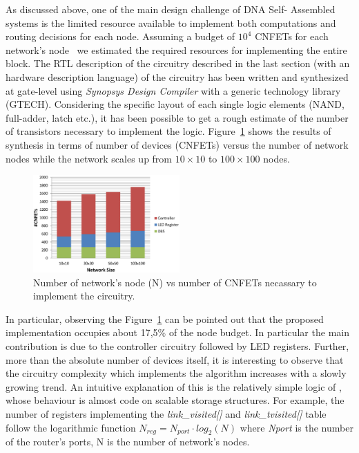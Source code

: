 As discussed above, one of the main design challenge of DNA Self-
Assembled systems is the limited resource available to implement both
computations and routing decisions for each node. Assuming a budget of
$10^4$ CNFETs for each network's node~\cite{liu_jetcs}  we estimated
the required resources for implementing the entire \disr{} block. The RTL
description of the circuitry described in the last section (with an
hardware description language)  of the \disr{} circuitry has been written
and synthesized at gate-level using \emph{Synopsys Design Compiler} with 
a generic technology library (GTECH).
Considering the specific layout of each single logic elements  (NAND,
full-adder, latch etc.), it has been possible to get a rough estimate
of the number of transistors necessary to implement the \disr{} logic.
Figure~\ref{fig:synthesys} shows the results of synthesis in terms of
number of devices (CNFETs) versus the number of network nodes while
the network scales up from $10\times10$ to $100\times100$ nodes.

\begin{figure}
  \centering
  \includegraphics[width=0.50\textwidth]{pictures/synthesis.eps}
  \caption{Number of network's node (N) vs number of CNFETs necassary to implement
  the \disr{} circuitry.}
 \label{fig:synthesys}
\end{figure}

In particular, observing the Figure~\ref{fig:synthesys} can  be
pointed out that the proposed implementation occupies about 17,5\% of
the node budget. In particular the main contribution is due to the
controller circuitry followed by LED registers. Further, more than the
absolute number of devices itself, it is interesting to observe that
the circuitry complexity which implements the \disr{} algorithm increases
with a slowly growing trend.   An intuitive explanation of this is the
relatively simple logic of \disr{}, whose behaviour is almost code on
scalable storage structures. For example, the number of registers
implementing the \emph{link\_visited[]} and \emph{link\_tvisited[]}
table follow the logarithmic function $N_{reg}=N_{port} \cdot
log_2(N)$ where \emph{Nport} is the number of the router’s ports, N is
the number of network’s nodes.

